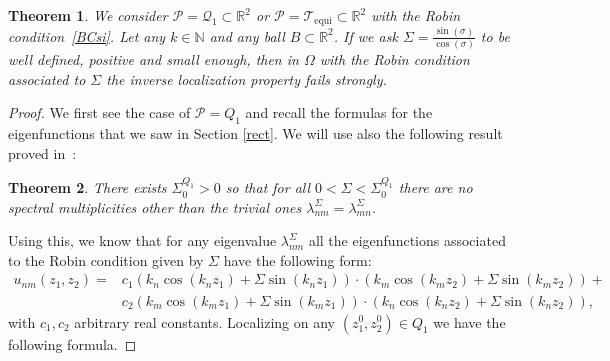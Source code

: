 \documentclass{amsart}
\newtheorem{theorem}{Theorem}[section]
\theoremstyle{definition}
\theoremstyle{remark}
\def\RR{\mathbb{R}}
\numberwithin{equation}{section}
\theoremstyle{definition}
\theoremstyle{remark}
\def\RR{\mathbb{R}}
\begin{document}
\begin{theorem}
	We consider $\mathcal{P}=\mathcal{Q}_1\subset\RR^2$ or $\mathcal{P}=\mathcal{T}_{\mathrm{equi}}\subset\RR^2$ with the Robin condition~\eqref{BCsi}. Let any $k\in\mathbb{N}$ and any ball $B\subset\mathbb{R}^2$. If we ask  $\Sigma=\frac{\sin(\sigma)}{\cos(\sigma)}$ to be well defined, positive and small enough, then in $\Omega$ with the Robin condition associated to $\Sigma$ the inverse localization property fails strongly.
\end{theorem}
\begin{proof}
	We first see the case of $\mathcal{P}=Q_1$ and recall the formulas for the eigenfunctions that we saw in Section \ref{rect}. We will use also the following result proved in~\cite[Theorem 1.1.]{RudWig}:
	\begin{theorem}\label{Rud}
		There exists $\Sigma_0^{Q_1}>0$ so that for all $0<\Sigma<\Sigma_0^{Q_1}$ there are no spectral multiplicities other than the trivial ones $\lambda_{nm}^\Sigma=\lambda_{mn}^\Sigma$.
	\end{theorem}
	Using this, we know that for any eigenvalue $\lambda_{nm}^\Sigma$ all the eigenfunctions associated to the Robin condition given by $\Sigma$ have the following form: 
	\begin{equation}
		\begin{aligned}
			u_{nm}(z_1,z_2)=&c_1\left(k_n\cos\left(k_nz_1\right)+\Sigma\sin(k_nz_1)\right)\cdot \left(k_m\cos\left(k_mz_2\right)+\Sigma\sin(k_mz_2)\right)+\\&c_2\left(k_m\cos\left(k_mz_1\right)+\Sigma\sin(k_mz_1)\right)\cdot \left(k_n\cos\left(k_nz_2\right)+\Sigma\sin(k_nz_2)\right),
		\end{aligned}
	\end{equation}
	with $c_1,c_2$ arbitrary real constants. Localizing on any $(z_1^0,z_2^0)\in Q_1$ we have the following formula.
	

\end{proof}
\end{document}
